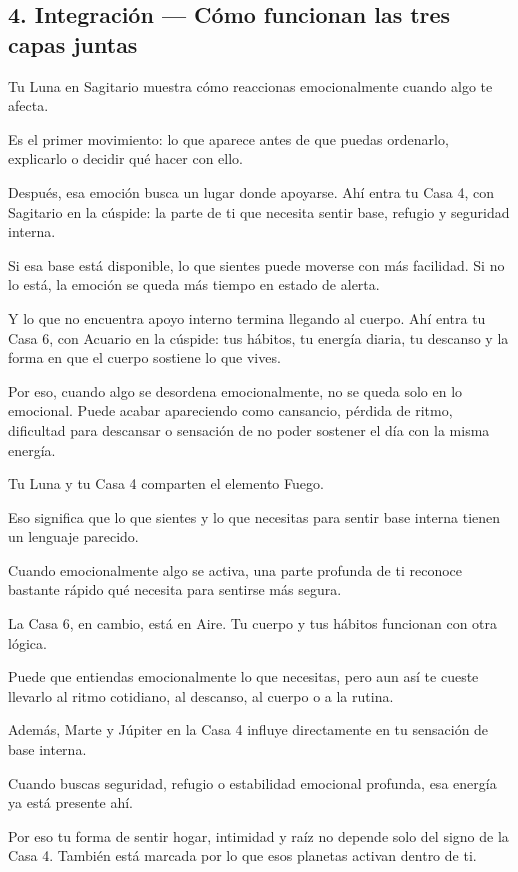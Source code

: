 \documentclass[11pt,a4paper]{article}
\begin{document}
\subsection{4. Integración — Cómo funcionan las tres capas juntas}

Tu Luna en Sagitario muestra cómo reaccionas emocionalmente cuando algo te afecta.

Es el primer movimiento: lo que aparece antes de que puedas ordenarlo, explicarlo o decidir qué hacer con ello.

Después, esa emoción busca un lugar donde apoyarse. Ahí entra tu Casa 4, con Sagitario en la cúspide: la parte de ti que necesita sentir base, refugio y seguridad interna.

Si esa base está disponible, lo que sientes puede moverse con más facilidad.
Si no lo está, la emoción se queda más tiempo en estado de alerta.

Y lo que no encuentra apoyo interno termina llegando al cuerpo. Ahí entra tu Casa 6, con Acuario en la cúspide: tus hábitos, tu energía diaria, tu descanso y la forma en que el cuerpo sostiene lo que vives.

Por eso, cuando algo se desordena emocionalmente, no se queda solo en lo emocional. Puede acabar apareciendo como cansancio, pérdida de ritmo, dificultad para descansar o sensación de no poder sostener el día con la misma energía.

Tu Luna y tu Casa 4 comparten el elemento Fuego.

Eso significa que lo que sientes y lo que necesitas para sentir base interna tienen un lenguaje parecido.

Cuando emocionalmente algo se activa, una parte profunda de ti reconoce bastante rápido qué necesita para sentirse más segura.

La Casa 6, en cambio, está en Aire. Tu cuerpo y tus hábitos funcionan con otra lógica.

Puede que entiendas emocionalmente lo que necesitas, pero aun así te cueste llevarlo al ritmo cotidiano, al descanso, al cuerpo o a la rutina.

Además, Marte y Júpiter en la Casa 4 influye directamente en tu sensación de base interna.

Cuando buscas seguridad, refugio o estabilidad emocional profunda, esa energía ya está presente ahí.

Por eso tu forma de sentir hogar, intimidad y raíz no depende solo del signo de la Casa 4. También está marcada por lo que esos planetas activan dentro de ti.
\end{document}
